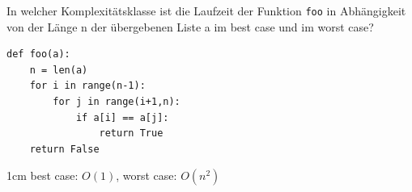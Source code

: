 \question[2]
In welcher Komplexitätsklasse ist die Laufzeit der
   Funktion \texttt{foo} in Abhängigkeit von der Länge
    n der übergebenen Liste a im best case und im worst case?
\begin{lstlisting}
def foo(a):
    n = len(a)
    for i in range(n-1):
        for j in range(i+1,n):
            if a[i] == a[j]:
                return True
    return False
\end{lstlisting}

\begin{solutionbox}{1cm}
best case: $O(1)$, worst case: $O(n^2)$
\end{solutionbox}
